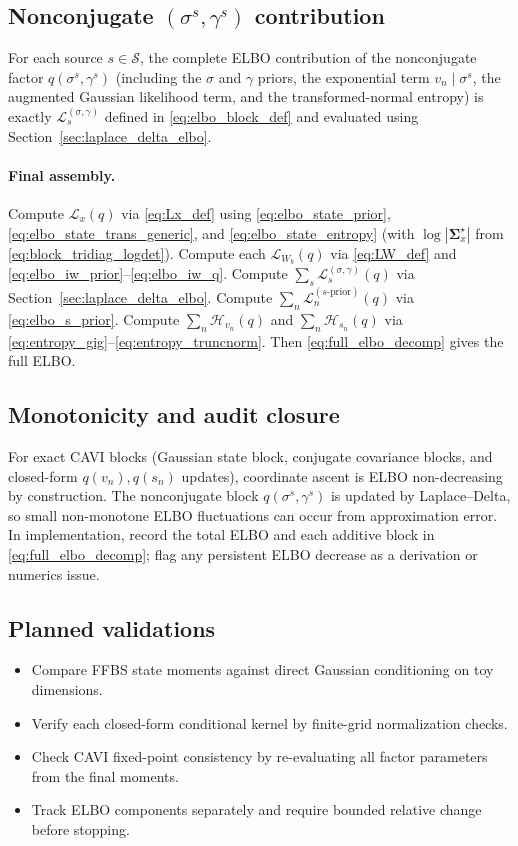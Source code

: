 \documentclass[11pt]{article}
\newcommand{\1}{\mathbb{I}}
\begin{document}
\subsection{Nonconjugate \texorpdfstring{$(\sigma^s,\gamma^s)$}{(sigma(s),gamma(s))} contribution}

For each source $s\in\mathcal{S}$, the complete ELBO contribution of the nonconjugate factor
$q(\sigma^s,\gamma^s)$ (including the $\sigma$ and $\gamma$ priors, the exponential term $v_n\mid\sigma^s$,
the augmented Gaussian likelihood term, and the transformed-normal entropy) is exactly
$\mathcal{L}_{s}^{(\sigma,\gamma)}$ defined in \eqref{eq:elbo_block_def} and evaluated using
Section~\ref{sec:laplace_delta_elbo}.

\paragraph{Final assembly.}
Compute $\mathcal{L}_{x}(q)$ via \eqref{eq:Lx_def} using
\eqref{eq:elbo_state_prior}, \eqref{eq:elbo_state_trans_generic}, and \eqref{eq:elbo_state_entropy}
(with $\log|\bm\Sigma_x^\star|$ from \eqref{eq:block_tridiag_logdet}).
Compute each $\mathcal{L}_{W_b}(q)$ via \eqref{eq:LW_def} and \eqref{eq:elbo_iw_prior}--\eqref{eq:elbo_iw_q}.
Compute $\sum_s \mathcal{L}_{s}^{(\sigma,\gamma)}(q)$ via Section~\ref{sec:laplace_delta_elbo}.
Compute $\sum_n \mathcal{L}_{n}^{(s\text{-prior})}(q)$ via \eqref{eq:elbo_s_prior}.
Compute $\sum_n \mathcal{H}_{v_n}(q)$ and $\sum_n \mathcal{H}_{s_n}(q)$ via
\eqref{eq:entropy_gig}--\eqref{eq:entropy_truncnorm}.
Then \eqref{eq:full_elbo_decomp} gives the full ELBO.

\subsection{Monotonicity and audit closure}
For exact CAVI blocks (Gaussian state block, conjugate covariance blocks, and closed-form
$q(v_n),q(s_n)$ updates), coordinate ascent is ELBO non-decreasing by construction.
The nonconjugate block $q(\sigma^s,\gamma^s)$ is updated by Laplace--Delta,
so small non-monotone ELBO fluctuations can occur from approximation error.
In implementation, record the total ELBO and each additive block in
\eqref{eq:full_elbo_decomp}; flag any persistent ELBO decrease as a derivation or numerics issue.

\subsection*{Planned validations}
\begin{itemize}
\item Compare FFBS state moments against direct Gaussian conditioning on toy dimensions.
\item Verify each closed-form conditional kernel by finite-grid normalization checks.
\item Check CAVI fixed-point consistency by re-evaluating all factor parameters from the final moments.
\item Track ELBO components separately and require bounded relative change before stopping.
\end{itemize}
\end{document}
